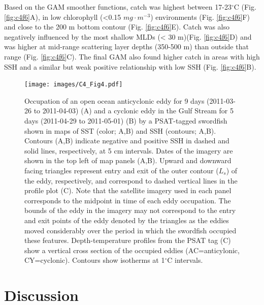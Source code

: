 Based on the GAM smoother functions, catch was highest between 17-23$^{\circ}$C (Fig. \ref{fig:c4f6}A), in low chlorophyll (<0.15 \(mg \cdot m^{-3}\)) environments (Fig. \ref{fig:c4f6}F) and close to the 200 m bottom contour (Fig. \ref{fig:c4f6}E). Catch was also negatively influenced by the most shallow MLDs (< 30 m)(Fig. \ref{fig:c4f6}D) and was higher at mid-range scattering layer depths (350-500 m) than outside that range (Fig. \ref{fig:c4f6}C). The final GAM also found higher catch in areas with high SSH and a similar but weak positive relationship with low SSH (Fig. \ref{fig:c4f6}B).

\begin{figure}[htbp]
\centering
\texttt{[image: images/C4\_Fig4.pdf]}
\caption[Example use of eddies by an archival-tagged swordfish]{Occupation of an open ocean anticyclonic eddy for 9 days (2011-03-26 to 2011-04-03) (A) and a cyclonic eddy in the Gulf Stream for 5 days (2011-04-29 to 2011-05-01) (B) by a PSAT-tagged swordfish shown in maps of SST (color; A,B) and SSH (contours; A,B). Contours (A,B) indicate negative and positive SSH in dashed and solid lines, respectively, at 5 cm intervals. Dates of the imagery are shown in the top left of map panels (A,B). Upward and downward facing triangles represent entry and exit of the outer contour ($L_s$) of the eddy, respectively, and correspond to dashed vertical lines in the profile plot (C). Note that the satellite imagery used in each panel corresponds to the midpoint in time of each eddy occupation. The bounds of the eddy in the imagery may not correspond to the entry and exit points of the eddy denoted by the triangles as the eddies moved considerably over the period in which the swordfish occupied these features. Depth-temperature profiles from the PSAT tag (C) show a vertical cross section of the occupied eddies (AC=anticylonic, CY=cyclonic). Contours show isotherms at 1$^{\circ}$C intervals.}
\label{fig:c4f4}
\end{figure}

\section{Discussion}

